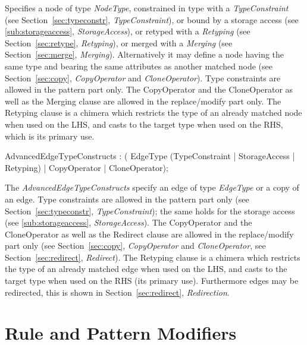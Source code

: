 Specifies a node of type \emph{NodeType},
constrained in type with a \emph{TypeConstraint} (see Section~\ref{sec:typeconstr}, \emph{TypeConstraint}),
or bound by a storage access (see \ref{sub:storageaccess}, \emph{StorageAccess}),
or retyped with a \emph{Retyping} (see Section~\ref{sec:retype}, \emph{Retyping}),
or merged with a \emph{Merging} (see Section~\ref{sec:merge}, \emph{Merging}).
Alternatively it may define a node having the same type and bearing the same attributes as another matched node (see Section~\ref{sec:copy}, \emph{CopyOperator} and \emph{CloneOperator}).
Type constraints are allowed in the pattern part only.
The CopyOperator and the CloneOperator as well as the Merging clause are allowed in the replace/modify part only.
The Retyping clause is a chimera which restricts the type of an already matched node when used on the LHS, and casts to the target type when used on the RHS, which is its primary use.

\begin{rail}
AdvancedEdgeTypeConstructs : ( EdgeType (TypeConstraint | StorageAccess | Retyping) | CopyOperator | CloneOperator);
\end{rail}

The \emph{AdvancedEdgeTypeConstructs} specify an edge of type \emph{EdgeType} or a copy of an edge.
Type constraints are allowed in the pattern part only (see Section~\ref{sec:typeconstr}, \emph{TypeConstraint}); 
the same holds for the storage access (see \ref{sub:storageaccess}, \emph{StorageAccess}).
The CopyOperator and the CloneOperator as well as the Redirect clause are allowed in the replace/modify part only (see Section~\ref{sec:copy}, \emph{CopyOperator} and \emph{CloneOperator}, see Section~\ref{sec:redirect}, \emph{Redirect}).
The Retyping clause is a chimera which restricts the type of an already matched edge when used on the LHS, and casts to the target type when used on the RHS (its primary use).
Furthermore edges may be redirected, this is shown in Section~\ref{sec:redirect}, \emph{Redirection}.


\section{Rule and Pattern Modifiers}
\label{sct:patternmodifier}

